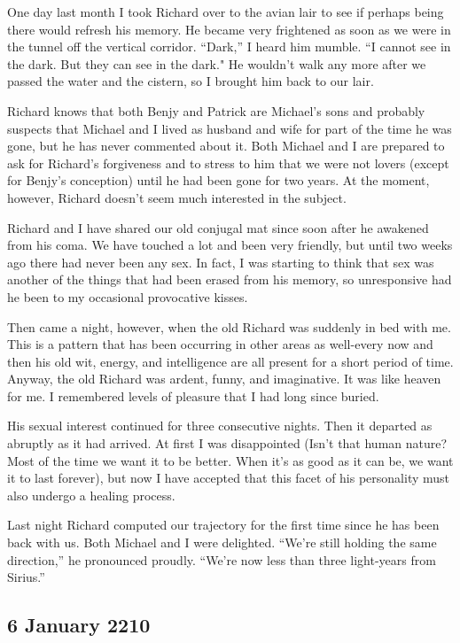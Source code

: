 \documentclass[]{article}
\begin{document}
{One day last month I took Richard over to the avian lair to see if perhaps being there would refresh his memory.  He became very frightened as soon as we were in the tunnel off the vertical corridor.  “Dark,” I heard him mumble.  “I cannot see in the dark.  But they can see in the dark."  He wouldn’t walk any more after we passed the water and the cistern, so I brought him back to our lair.

Richard knows that both Benjy and Patrick are Michael’s sons and probably suspects that Michael and I lived as husband and wife for part of the time he was gone, but he has never commented about it.  Both Michael and I are prepared to ask for Richard’s forgiveness and to stress to him that we were not lovers (except for Benjy’s conception) until he had been gone for two years.  At the moment, however, Richard doesn’t seem much interested in the subject.

Richard and I have shared our old conjugal mat since soon after he awakened from his coma.  We have touched a lot and been very friendly, but until two weeks ago there had never been any sex.  In fact, I was starting to think that sex was another of the things that had been erased from his memory, so unresponsive had he been to my occasional provocative kisses.

Then came a night, however, when the old Richard was suddenly in bed with me.  This is a pattern that has been occurring in other areas as well-every now and then his old wit, energy, and intelligence are all present for a short period of time.  Anyway, the old Richard was ardent, funny, and imaginative.  It was like heaven for me.  I remembered levels of pleasure that I had long since buried.

His sexual interest continued for three consecutive nights.  Then it departed as abruptly as it had arrived.  At first I was disappointed (Isn’t that human nature? Most of the time we want it to be better.  When it’s as good as it can be, we want it to last forever), but now I have accepted that this facet of his personality must also undergo a healing process.

Last night Richard computed our trajectory for the first time since he has been back with us.  Both Michael and I were delighted.  “We’re still holding the same direction,” he pronounced proudly.  “We’re now less than three light-years from Sirius.”

\subsection*{6 January 2210}

}
\end{document}
